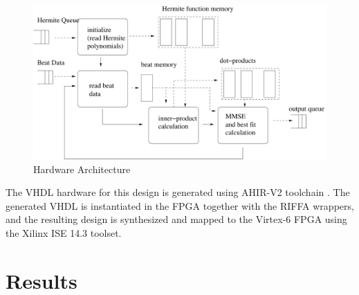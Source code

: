 \documentclass[runningheads]{llncs}
\begin{document}
\begin{figure}
\begin{center}
	\includegraphics[scale=0.50]{HardwareArchitecture.pdf}
	\caption{Hardware Architecture}
	\label{fig:HardwareArchitecture}
\end{center}
\end{figure}

The VHDL hardware for this design is generated using AHIR-V2 toolchain \cite{c:ahir_usenix2012}.  
The generated VHDL is instantiated in the FPGA together with the RIFFA wrappers,
and the resulting design is synthesized and mapped to the Virtex-6 FPGA using
the Xilinx ISE 14.3 toolset.


%
%
%
%
\section{Results}\label{s:results}
\end{document}
